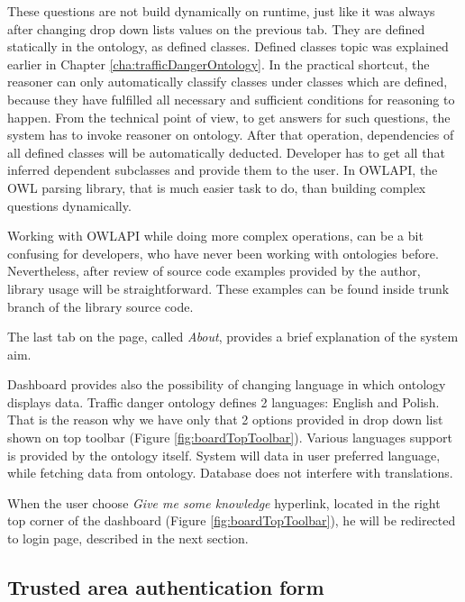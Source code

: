 These questions are not build dynamically on runtime, just like it was always after changing drop down lists values on the previous tab. They are defined statically in the ontology, as defined classes. Defined classes topic was explained earlier in Chapter \ref{cha:trafficDangerOntology}. In the practical shortcut, the reasoner can only automatically classify classes under classes which are defined, because they have fulfilled all necessary and sufficient conditions for reasoning to happen. From the technical point of view, to get answers for such questions, the system has to invoke reasoner on ontology. After that operation, dependencies of all defined classes will be automatically deducted. Developer has to get all that inferred dependent subclasses and provide them to the user. In OWLAPI, the OWL parsing library, that is much easier task to do, than building complex questions dynamically. 

\begin{framed}
\noindent Working with OWLAPI while doing more complex operations, can be a bit confusing for developers, who have never been working with ontologies before. Nevertheless, after review of source code examples provided by the author, library usage will be straightforward. These examples can be found inside trunk branch of the library source code.
\end{framed}

\noindent The last tab on the page, called \textit{About}, provides a brief explanation of the system aim.

\bigskip

\noindent Dashboard provides also the possibility of changing language in which ontology displays data. Traffic danger ontology defines 2 languages: English and Polish. That is the reason why we have only that 2 options provided in drop down list shown on top toolbar (Figure \ref{fig:boardTopToolbar}). Various languages support is provided by the ontology itself. System will data in user preferred language, while fetching data from ontology. Database does not interfere with translations.

When the user choose \textit{Give me some knowledge} hyperlink, located in the right top corner of the dashboard (Figure \ref{fig:boardTopToolbar}), he will be redirected to login page, described in the next section.

\newpage

\subsection{Trusted area authentication form}
\label{sub:trustedAreaAuthenticationForm}

